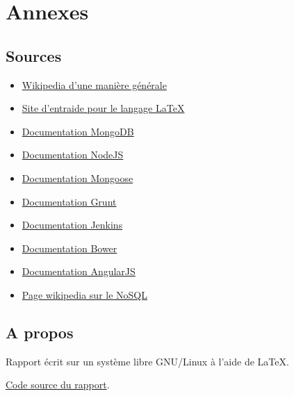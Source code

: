 \documentclass{report}
\begin{document}
\chapter{Annexes}

\section{Sources}

\begin{itemize}
	\item \href{http://fr.wikipedia.org/}{Wikipedia d'une manière générale}
	\item \href{http://tex.stackexchange.com/}{Site d'entraide pour le langage LaTeX}
	\item \href{http://www.mongodb.org/}{Documentation MongoDB}
	\item \href{http://nodejs.org/}{Documentation NodeJS}
	\item \href{http://mongoosejs.com/}{Documentation Mongoose}
	\item \href{http://gruntjs.com/}{Documentation Grunt}
	\item \href{http://jenkins-ci.org/}{Documentation Jenkins}
	\item \href{http://bower.io/}{Documentation Bower}
	\item \href{https://angularjs.org/}{Documentation AngularJS}
	\item \href{http://fr.wikipedia.org/wiki/NoSQL}{Page wikipedia sur le NoSQL}
\end{itemize}



\section{A propos}
\begin{description}
	\item Rapport écrit sur un système libre GNU/Linux à l'aide de \LaTeX. 
	\item \href{https://github.com/llaine/internship-L3}{Code source du rapport}.
\end{description}



\printglossaries
\end{document}
